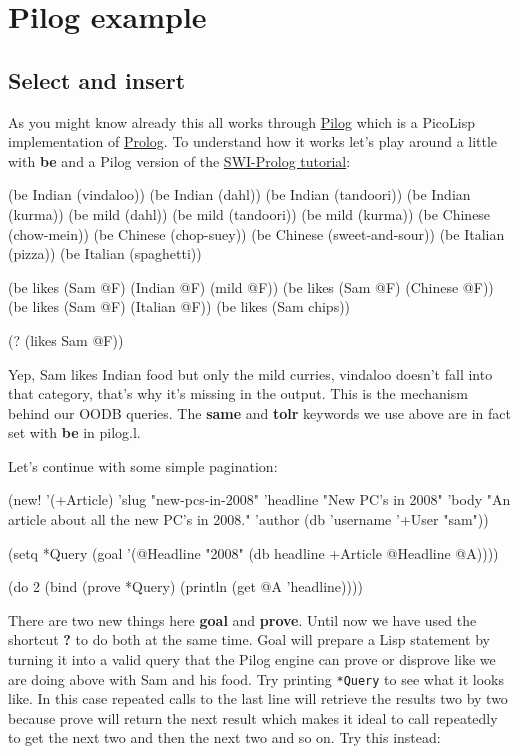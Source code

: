 \section{Pilog example}
\label{sec:advanced-oodb}

\subsection{Select and insert}
\label{sec:advanced-oodb}

As you might know already this all works through
\href{http://www.software-lab.de/ref.html#pilog}{Pilog} which is a
PicoLisp implementation of
\href{http://en.wikipedia.org/wiki/Prolog}{Prolog}. To understand how
it works let's play around a little with \textbf{be} and a Pilog
version of the
\href{http://www.swi-prolog.org/documentation.html}{SWI-Prolog
  tutorial}:


\begin{wideverbatim}
(be Indian (vindaloo))
(be Indian (dahl))
(be Indian (tandoori))
(be Indian (kurma))
(be mild (dahl))
(be mild (tandoori))
(be mild (kurma))
(be Chinese (chow-mein))
(be Chinese (chop-suey))
(be Chinese (sweet-and-sour))
(be Italian (pizza))
(be Italian (spaghetti))

(be likes (Sam @F) (Indian @F) (mild @F))
(be likes (Sam @F) (Chinese @F))
(be likes (Sam @F) (Italian @F))
(be likes (Sam chips))

(? (likes Sam @F))
\end{wideverbatim}

Yep, Sam likes Indian food but only the mild curries, vindaloo doesn't
fall into that category, that's why it's missing in the output. This
is the mechanism behind our OODB queries. The \textbf{same} and
\textbf{tolr} keywords we use above are in fact set with \textbf{be}
in pilog.l.

Let's continue with some simple pagination:

\begin{wideverbatim}
(new! '(+Article) 'slug "new-pcs-in-2008" 'headline "New PC's in 2008" 
'body "An article about all the new PC's in 2008." 'author (db 'username '+User "sam"))

(setq *Query (goal '(@Headline "2008" (db headline +Article @Headline @A))))

(do 2 (bind (prove *Query) (println (get @A 'headline))))
\end{wideverbatim}

There are two new things here \textbf{goal} and \textbf{prove}. Until
now we have used the shortcut \textbf{?} to do both at the same time.
Goal will prepare a Lisp statement by turning it into a valid query
that the Pilog engine can prove or disprove like we are doing above
with Sam and his food. Try printing \texttt{*Query} to see what it
looks like. In this case repeated calls to the last line will retrieve
the results two by two because prove will return the next result which
makes it ideal to call repeatedly to get the next two and then the
next two and so on. Try this instead:


